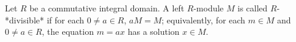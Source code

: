 Let $R$ be a commutative integral domain. A left $R$-module $M$ is called $R$-*divisible* if for each $0 \neq a \in R$, $aM = M$; equivalently, for each $m \in M$ and $0 \neq a \in R$, the equation $m = ax$ has a solution $x \in M$.
